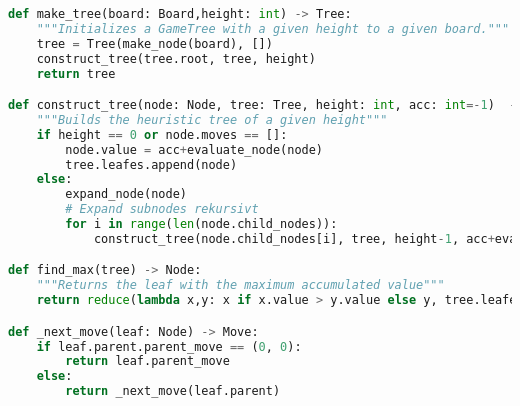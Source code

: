 \clearpage
\begin{lstlisting}[language=Python, caption={Funktioner for Tree}, label={code:tree}]
def make_tree(board: Board,height: int) -> Tree:
    """Initializes a GameTree with a given height to a given board."""
    tree = Tree(make_node(board), [])
    construct_tree(tree.root, tree, height)
    return tree

def construct_tree(node: Node, tree: Tree, height: int, acc: int=-1)  -> None:
    """Builds the heuristic tree of a given height"""
    if height == 0 or node.moves == []:
        node.value = acc+evaluate_node(node)
        tree.leafes.append(node)
    else:
        expand_node(node)
        # Expand subnodes rekursivt
        for i in range(len(node.child_nodes)):
            construct_tree(node.child_nodes[i], tree, height-1, acc+evaluate_node(node.child_nodes[i]))

def find_max(tree) -> Node:
    """Returns the leaf with the maximum accumulated value"""
    return reduce(lambda x,y: x if x.value > y.value else y, tree.leafes)

def _next_move(leaf: Node) -> Move:
    if leaf.parent.parent_move == (0, 0):
        return leaf.parent_move
    else:
        return _next_move(leaf.parent)
\end{lstlisting}